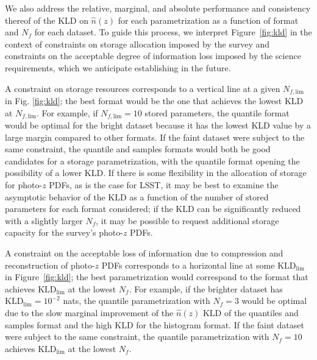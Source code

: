\documentclass[\docopts]{\docclass}
\newcommand{\pz}{photo-$z$ PDF}
\newcommand{\mgdata}{bright\xspace}
\newcommand{\ssdata}{faint\xspace}
\begin{document}
We also address the relative, marginal, and absolute performance and 
consistency thereof of the KLD on $\hat{n}(z)$ for each parametrization as a 
function of format and $N_{f}$ for each dataset.
To guide this process, we interpret Figure~\ref{fig:kld} in the context of 
constraints on storage allocation imposed by the survey and constraints on the 
acceptable degree of information loss imposed by the science requirements, 
which we anticipate establishing in the future.

A constraint on storage resources corresponds to a vertical line at a given 
$N_{f, \mathrm{lim}}$ in Fig. \ref{fig:kld}; the best format would be the one 
that achieves the lowest KLD at $N_{f, \mathrm{lim}}$.
For example, if $N_{f, \mathrm{lim}}=10$ stored parameters, the quantile format 
would be optimal for the \mgdata dataset because it has the lowest KLD value by 
a large margin compared to other formats.
If the \ssdata dataset were subject to the same constraint, the quantile and 
samples formats would both be good candidates for a storage parametrization, 
with the quantile format opening the possibility of a lower KLD.
If there is some flexibility in the allocation of storage for \pz s, as is the 
case for LSST, it may be best to examine the asymptotic behavior of the KLD as 
a function of the number of stored parameters for each format considered; if 
the KLD can be significantly reduced with a slightly larger $N_{f}$, it may be 
possible to request additional storage capacity for the survey's \pz s.

A constraint on the acceptable loss of information due to compression and 
reconstruction of \pz s corresponds to a horizontal line at some 
$\mathrm{KLD}_{\mathrm{lim}}$ in Figure~\ref{fig:kld}; the best parametrization 
would correspond to the format that achieves $\mathrm{KLD}_{\mathrm{lim}}$ at 
the lowest $N_{f}$.
For example, if the brighter dataset has $\mathrm{KLD}_{\mathrm{lim}}=10^{-2}$ 
nats, the quantile parametrization with $N_{f}=3$ would be optimal due to the 
slow marginal improvement of the $\hat{n}(z)$ KLD of the quantiles and samples 
format and the high KLD for the histogram format.
If the \ssdata dataset were subject to the same constraint, the quantile 
parametrization with $N_{f}=10$ achieves $\mathrm{KLD}_{\mathrm{lim}}$ at the 
lowest $N_{f}$.
\end{document}
